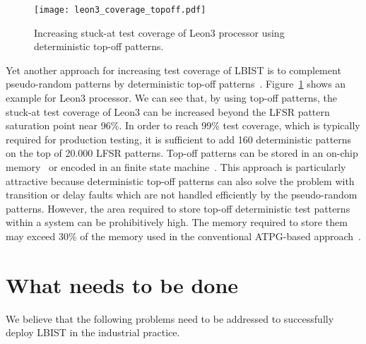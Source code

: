 \documentclass[conference]{IEEEtran}
\begin{document}
\begin{figure}[t]
\begin{center}
\texttt{[image: leon3\_coverage\_topoff.pdf]}
\caption{Increasing stuck-at test coverage of Leon3 processor using deterministic top-off patterns.}\label{leon_top}
\end{center}
\end{figure}

Yet another approach for increasing test coverage of LBIST is to complement pseudo-random patterns by deterministic top-off patterns~\cite{bist}. Figure~\ref{leon_top} shows an example for Leon3 processor.
We can see that, by using top-off patterns, the stuck-at test coverage of Leon3 can be increased beyond the LFSR pattern saturation point near 96\%. In order to reach 99\% test coverage, which is typically required for production testing, it is sufficient to add 160 deterministic patterns 
on the top of 20.000 LFSR patterns.
Top-off patterns can be stored in an on-chip memory~\cite{SaDB84} or encoded in an finite state machine~\cite{LiD14}. 
This approach is particularly attractive because deterministic top-off patterns can also solve 
the problem with transition or delay faults which are not handled efficiently by the
pseudo-random patterns. 
However, the area required to store top-off deterministic test patterns
within a system can be prohibitively high.
The memory required to store them may exceed 30\% of the memory used in the conventional ATPG-based approach~\cite{HeF99}.

\section{What needs to be done} \label{needs}

We believe that the following problems need to be addressed to successfully deploy LBIST in the industrial practice. 
\end{document}
